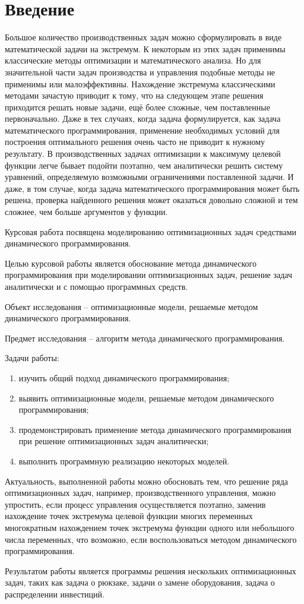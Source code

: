 \section*{Введение}

\indent Большое количество производственных задач можно сформулировать в виде математической задачи на экстремум. К некоторым из этих задач применимы классические методы оптимизации и математического анализа. Но для значительной части задач производства и управления подобные методы не применимы или малоэффективны. Нахождение экстремума классическими методами зачастую приводит к тому, что на следующем этапе решения приходится решать новые задачи, ещё более сложные, чем поставленные первоначально. Даже в тех случаях, когда задача формулируется, как задача математического программирования, применение необходимых условий для построения оптимального решения очень часто не приводит к нужному результату. В производственных задачах оптимизации к максимуму целевой функции легче бывает подойти поэтапно, чем аналитически решить систему уравнений, определяемую возможными ограничениями поставленной задачи. И даже, в том случае, когда задача математического программирования может быть решена, проверка найденного решения может оказаться довольно сложной и тем сложнее, чем больше аргументов у функции.

Курсовая работа посвящена моделированию оптимизационных задач средствами динамического программирования.

Целью курсовой работы является обоснование метода динамического программирования при моделировании оптимизационных задач, решение задач аналитически и с помощью программных средств.

Объект исследования -- оптимизационные модели, решаемые методом динамического программирования.

Предмет исследования -- алгоритм метода динамического программирования.

\newpage

Задачи работы:
\begin{enumerate}
    \item изучить общий подход динамического программирования;
    \item выявить оптимизационные модели, решаемые методом динамического программирования;
    \item продемонстрировать применение метода динамического программирования при решение оптимизационных задач аналитически;
    \item выполнить программную реализацию некоторых моделей.
\end{enumerate}

Актуальность, выполненной работы можно обосновать тем, что решение ряда оптимизационных задач, например, производственного управления, можно упростить, если процесс управления осуществляется поэтапно, заменив нахождение точек экстремума целевой функции многих переменных многократным нахождением точек экстремума функции одного или небольшого числа переменных, что возможно, если воспользоваться методом динамического программирования.

Результатом работы является программы решения нескольких оптимизационных задач, таких как задача о рюкзаке, задачи о замене оборудования, задача о распределении инвестиций.
